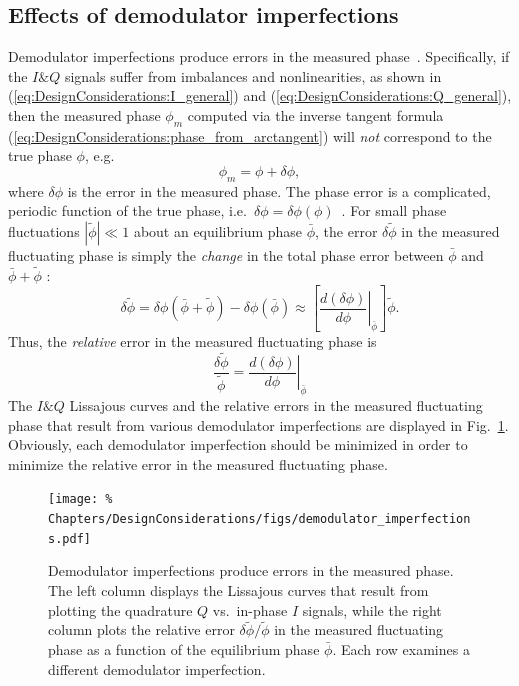 \subsection{Effects of demodulator imperfections}
Demodulator imperfections produce errors
in the measured phase~\cite{vanzeeland_rsi04,kasten_masters}.
Specifically, if the $I\&Q$ signals suffer from imbalances and nonlinearities,
as shown in (\ref{eq:DesignConsiderations:I_general}) and
(\ref{eq:DesignConsiderations:Q_general}),
then the measured phase $\phi_m$ computed via the inverse tangent formula
(\ref{eq:DesignConsiderations:phase_from_arctangent})
will \emph{not} correspond to the true phase $\phi$, e.g.\
\begin{equation}
  \phi_m = \phi + \delta \phi,
\end{equation}
where $\delta\phi$ is the error in the measured phase.
The phase error is a complicated, periodic function of the true phase,
i.e.\ $\delta\phi = \delta\phi(\phi)$~\cite{vanzeeland_rsi04}.
For small phase fluctuations $|\tilde{\phi}| \ll 1$
about an equilibrium phase $\bar{\phi}$,
the error $\delta\tilde{\phi}$ in the measured fluctuating phase
is simply the \emph{change} in the total phase error
between $\bar{\phi}$ and $\bar{\phi} + \tilde{\phi}$
\cite{kasten_masters}:
\begin{equation}
  \delta\tilde{\phi}
  =
  \delta\phi(\bar{\phi} + \tilde{\phi}) - \delta\phi(\bar{\phi})
  \approx
  \left[%
    \left. \frac{d(\delta\phi)}{d\phi} \right|_{\bar{\phi}}
  \right] \tilde{\phi}.
\end{equation}
Thus, the \emph{relative} error in the measured fluctuating phase is
\begin{equation}
  \frac{\delta\tilde{\phi}}{\tilde{\phi}}
  =
  \left. \frac{d(\delta\phi)}{d\phi} \right|_{\bar{\phi}}
  \label{eq:DesignConsiderations:relative_fluctuation_error}
\end{equation}
The $I\&Q$ Lissajous curves and
the relative errors in the measured fluctuating phase
that result from various demodulator imperfections
are displayed in
Fig.~\ref{fig:DesignConsiderations:effects_of_demodulator_imperfections}.
Obviously, each demodulator imperfection should be minimized
in order to minimize the relative error
in the measured fluctuating phase.

\begin{figure}
  \centering
  \texttt{[image: \%
    Chapters/DesignConsiderations/figs/demodulator\_imperfections.pdf]}
  \caption[Effects of demodulator imperfections]{%
    Demodulator imperfections produce errors in the measured phase.
    The left column displays the Lissajous curves
    that result from plotting
    the quadrature $Q$ vs.\ in-phase $I$ signals, while
    the right column plots the relative error
    $\delta\tilde{\phi} / \tilde{\phi}$
    in the measured fluctuating phase
    as a function of the equilibrium phase $\bar{\phi}$.
    Each row examines a different demodulator imperfection.
  }
  \label{fig:DesignConsiderations:effects_of_demodulator_imperfections}
\end{figure}


